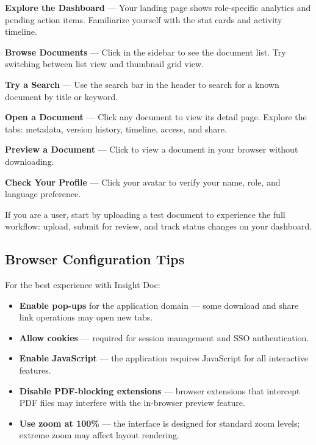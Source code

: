 \begin{ugSteps}
  \item \textbf{Explore the Dashboard} --- Your landing page
        shows role-specific analytics and pending action items.
        Familiarize yourself with the stat cards and activity
        timeline.
  \item \textbf{Browse Documents} --- Click 
        in the sidebar to see the document list. Try switching
        between list view and thumbnail grid view.
  \item \textbf{Try a Search} --- Use the search bar in the
        header to search for a known document by title or
        keyword.
  \item \textbf{Open a Document} --- Click any document to view
        its detail page. Explore the tabs: metadata, version
        history, timeline, access, and share.
  \item \textbf{Preview a Document} --- Click 
        to view a document in your browser without downloading.
  \item \textbf{Check Your Profile} --- Click your avatar to
        verify your name, role, and language preference.
\end{ugSteps}

\begin{ugTip}
  If you are a  user, start by uploading a test
  document to experience the full workflow: upload, submit for
  review, and track status changes on your dashboard.
\end{ugTip}

\subsection{Browser Configuration Tips}

For the best experience with Insight Doc:

\begin{itemize}[leftmargin=18pt]
  \item \textbf{Enable pop-ups} for the application domain ---
        some download and share link operations may open new
        tabs.
  \item \textbf{Allow cookies} --- required for session
        management and SSO authentication.
  \item \textbf{Enable JavaScript} --- the application requires
        JavaScript for all interactive features.
  \item \textbf{Disable PDF-blocking extensions} --- browser
        extensions that intercept PDF files may interfere with
        the in-browser preview feature.
  \item \textbf{Use zoom at 100\%} --- the interface is designed
        for standard zoom levels; extreme zoom may affect
        layout rendering.
\end{itemize}

\newpage
